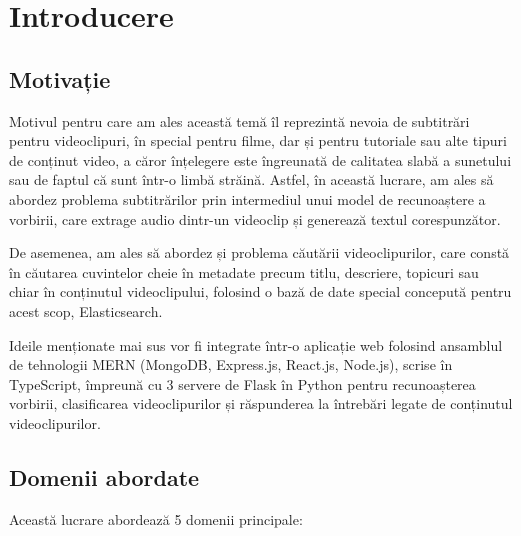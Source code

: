 \chapter{Introducere}

\section{Motivație}

Motivul pentru care am ales această temă îl reprezintă nevoia de subtitrări pentru videoclipuri, în special pentru filme, 
dar și pentru tutoriale sau alte tipuri de conținut video, a căror înțelegere este îngreunată de calitatea slabă a sunetului 
sau de faptul că sunt într-o limbă străină. Astfel, în această lucrare, am ales să abordez problema subtitrărilor prin
intermediul unui model de recunoaștere a vorbirii, care extrage audio dintr-un videoclip și generează textul corespunzător.
\par
De asemenea, am ales să abordez și problema căutării videoclipurilor, care constă în căutarea cuvintelor cheie în metadate
precum titlu, descriere, topicuri sau chiar în conținutul videoclipului, folosind o bază de date special concepută pentru
acest scop, Elasticsearch. \cite{elasticsearch}
\par
Ideile menționate mai sus vor fi integrate într-o aplicație web folosind ansamblul de tehnologii MERN (MongoDB, Express.js, React.js, Node.js),
scrise în TypeScript, împreună cu 3 servere de Flask în Python pentru recunoașterea vorbirii, clasificarea videoclipurilor și
răspunderea la întrebări legate de conținutul videoclipurilor.


\section{Domenii abordate}

Această lucrare abordează 5 domenii principale:

